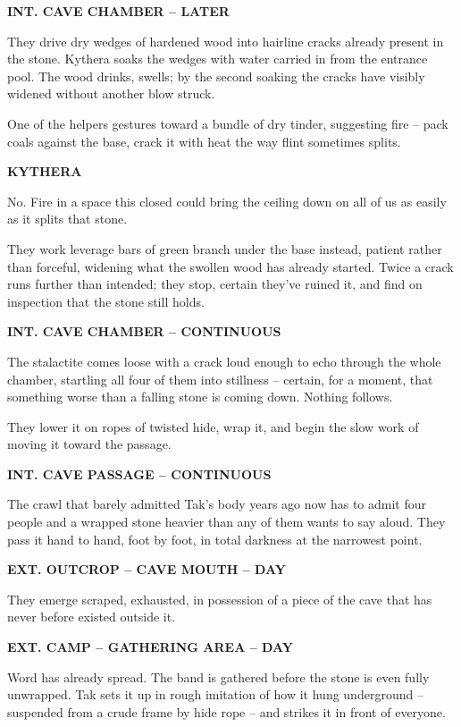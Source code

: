\documentclass[12pt]{article}
\newcommand{\sceneheading}[1]{%
  \bigskip\noindent\textbf{#1}\par\smallskip
}
\newcommand{\action}[1]{%
  \noindent #1\par\medskip
}
\newcommand{\charcue}[1]{%
  \par\hspace*{2.2in}\textbf{#1}\par
}
\newenvironment{dialogue}{%
  \begin{list}{}{\leftmargin=1.5in\rightmargin=2in\itemsep=0pt\parsep=0pt\topsep=0pt}
  \item[]
}{%
  \end{list}\medskip
}
\begin{document}
\sceneheading{INT. CAVE CHAMBER -- LATER}

\action{They drive dry wedges of hardened wood into hairline cracks already present in the stone. Kythera soaks the wedges with water carried in from the entrance pool. The wood drinks, swells; by the second soaking the cracks have visibly widened without another blow struck.}

\action{One of the helpers gestures toward a bundle of dry tinder, suggesting fire -- pack coals against the base, crack it with heat the way flint sometimes splits.}

\charcue{KYTHERA}
\begin{dialogue}
No. Fire in a space this closed could bring the ceiling down on all of us as easily as it splits that stone.
\end{dialogue}

\action{They work leverage bars of green branch under the base instead, patient rather than forceful, widening what the swollen wood has already started. Twice a crack runs further than intended; they stop, certain they've ruined it, and find on inspection that the stone still holds.}

\sceneheading{INT. CAVE CHAMBER -- CONTINUOUS}

\action{The stalactite comes loose with a crack loud enough to echo through the whole chamber, startling all four of them into stillness -- certain, for a moment, that something worse than a falling stone is coming down. Nothing follows.}

\action{They lower it on ropes of twisted hide, wrap it, and begin the slow work of moving it toward the passage.}

\sceneheading{INT. CAVE PASSAGE -- CONTINUOUS}

\action{The crawl that barely admitted Tak's body years ago now has to admit four people and a wrapped stone heavier than any of them wants to say aloud. They pass it hand to hand, foot by foot, in total darkness at the narrowest point.}

\sceneheading{EXT. OUTCROP -- CAVE MOUTH -- DAY}

\action{They emerge scraped, exhausted, in possession of a piece of the cave that has never before existed outside it.}

\sceneheading{EXT. CAMP -- GATHERING AREA -- DAY}

\action{Word has already spread. The band is gathered before the stone is even fully unwrapped. Tak sets it up in rough imitation of how it hung underground -- suspended from a crude frame by hide rope -- and strikes it in front of everyone.}
\end{document}
